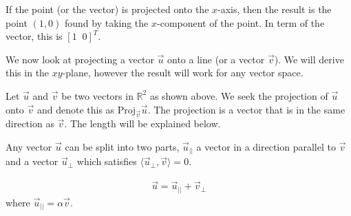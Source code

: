 If the point (or the vector) is projected onto the $x$-axis, then the result is the point $(1,0)$ found by taking the $x$-component of the point.  In term of the vector, this is $[1\;\;0]^T$.  

We now look at projecting a vector $\vec{u}$ onto a line (or a vector $\vec{v}$).  We will derive this in the $xy$-plane, however the result will work for any vector space.  

\begin{center}
\end{center}

Let $\vec{u}$ and $\vec{v}$ be two vectors in $\mathbb{R}^2$ as shown above.  We seek the projection of $\vec{u}$ onto $\vec{v}$ and denote this as $\text{Proj}_{\vec{v}} \vec{u}$.  The projection is a vector that is in the same direction as $\vec{v}$.  The length will be explained below.   

Any vector $\vec{u}$ can be split into two parts, $\vec{u}_{||}$ a vector in a direction parallel to $\vec{v}$ and a vector $\vec{u}_{\perp}$ which satisfies $\langle \vec{u}_{\perp} , \vec{v} \rangle = 0$.   

\begin{align} \label{eq:proj:derive}
\vec{u} = \vec{u}_{||} + \vec{v}_{\perp}
\end{align}
where $\vec{u}_{||} = \alpha \vec{v}$.  

